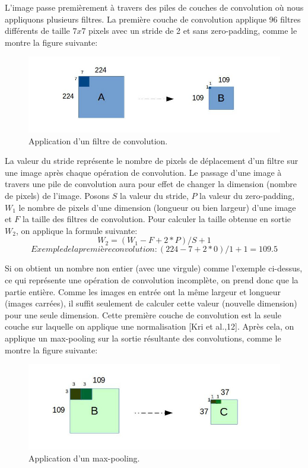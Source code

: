 	L'image passe premièrement à travers des piles de couches de convolution où nous appliquons plusieurs filtres. La première couche de convolution applique 96 filtres différents de taille $7x7$ pixels avec un stride de 2 et sans zero-padding, comme le montre la figure suivante:

\begin{figure}[H]
	\centering
		\includegraphics[width=5in]{Figures/conv.jpg}
	\caption[An Electron]{Application d'un filtre de convolution.}
	\label{fig:Electron}
\end{figure}

	La valeur du stride représente le nombre de pixels de déplacement d'un filtre sur une image après chaque opération de convolution. Le passage d'une image à travers une pile de convolution aura pour effet de changer la dimension (nombre de pixels) de l'image. Posons $S$ la valeur du stride, $P$ la valeur du zero-padding, $W_{1}$ le nombre de pixels d'une dimension (longueur ou bien largeur) d'une image et $F$ la taille des filtres de convolution. Pour calculer la taille obtenue en sortie $W_{2}$, on applique la formule suivante:
$$W_{2} = (W_{1} - F + 2*P)/S + 1$$
$$Exemple de la première convolution: (224 - 7 + 2*0)/1 +1 = 109.5$$
	
	Si on obtient un nombre non entier (avec une virgule) comme l'exemple ci-dessus, ce qui représente une opération de convolution incomplète, on prend donc que la partie entière. Comme les images en entrée ont la même largeur et longueur (images carrées), il suffit seulement de calculer cette valeur (nouvelle dimension) pour une seule dimension.
	Cette première couche de convolution est la seule couche sur laquelle on applique une normalisation [Kri et al.,12]. Après cela, on applique un max-pooling sur la sortie résultante des convolutions, comme le montre la figure suivante:

\begin{figure}[H]
	\centering
		\includegraphics[width=5in]{Figures/pool.jpg}
	\caption[An Electron]{Application d'un max-pooling.}
	\label{fig:Electron}
\end{figure}

